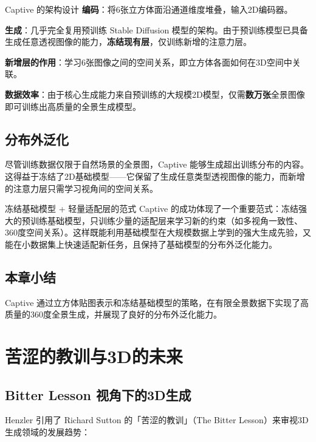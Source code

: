 \documentclass[a4paper]{article}
\begin{document}
\begin{importantbox}{Captive 的架构设计}
\textbf{编码}：将6张立方体面沿通道维度堆叠，输入2D编码器。

\textbf{生成}：几乎完全复用预训练 Stable Diffusion 模型的架构。由于预训练模型已具备生成任意透视图像的能力，\textbf{冻结现有层}，仅训练新增的注意力层。

\textbf{新增层的作用}：学习6张图像之间的空间关系，即立方体各面如何在3D空间中关联。

\textbf{数据效率}：由于核心生成能力来自预训练的大规模2D模型，仅需\textbf{数万张}全景图像即可训练出高质量的全景生成模型。
\end{importantbox}

\subsection{分布外泛化}

尽管训练数据仅限于自然场景的全景图，Captive 能够生成超出训练分布的内容。这得益于冻结了2D基础模型——它保留了生成任意类型透视图像的能力，而新增的注意力层只需学习视角间的空间关系。

\begin{knowledgebox}{冻结基础模型 + 轻量适配层的范式}
Captive 的成功体现了一个重要范式：冻结强大的预训练基础模型，只训练少量的适配层来学习新的约束（如多视角一致性、360度空间关系）。这样既能利用基础模型在大规模数据上学到的强大生成先验，又能在小数据集上快速适配新任务，且保持了基础模型的分布外泛化能力。
\end{knowledgebox}

\subsection{本章小结}

Captive 通过立方体贴图表示和冻结基础模型的策略，在有限全景数据下实现了高质量的360度全景生成，并展现了良好的分布外泛化能力。

\section{苦涩的教训与3D的未来}

\subsection{Bitter Lesson 视角下的3D生成}

Henzler 引用了 Richard Sutton 的「苦涩的教训」（The Bitter Lesson）来审视3D生成领域的发展趋势：
\end{document}
